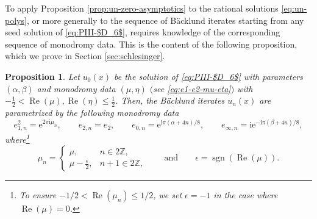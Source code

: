 \documentclass[pdftex]{sigma}
\numberwithin{equation}{section}
\newtheorem{prop}[Theorem]{Proposition}
 { \theoremstyle{definition}
\newtheorem{Definition}[Theorem]{Definition}
\newtheorem{Note}[Theorem]{Note}
\newtheorem{Example}[Theorem]{Example}
\newtheorem{Remark}[Theorem]{Remark} }
\newcommand{\ee}{\mathrm{e}}
\newcommand{\ii}{\mathrm{i}}
\newcommand{\Z}{{\mathbb{Z}}}
\newcommand{\re}{\operatorname{Re}}
\newcommand{\sgn}{\operatorname{sgn}}
\begin{document}
To apply Proposition \ref{prop:un-zero-asymptotics} to the rational solutions \eqref{eq:un-polys}, or more generally to the sequence of B\"acklund iterates starting from any seed solution of \eqref{eq:PIII-$D_6$}, requires knowledge of the corresponding sequence of monodromy data. This is the content of the following proposition, which we prove in Section \ref{sec:schlesinger}.
\begin{prop}\label{prop:schlesinger}
Let $u_0(x)$ be the solution of \eqref{eq:PIII-$D_6$} with parameters $(\alpha,\beta)$ and monodromy data $(\mu,\eta)$ $($see \eqref{eq:e1-e2-mu-eta}$)$ with $-\frac{1}{2}<\re (\mu), \re(\eta)\le\frac{1}{2}$. Then, the B\"acklund iterates $u_n(x)$ are parametrized by the following monodromy data
\[
e^2_{1, n} = \ee^{2\pi \ii \mu_n} ,\qquad e_{2, n} = e_2, \qquad e_{0,n}=\ee^{{\ii\pi(\alpha+4n)}/{8}}, \qquad e_{\infty,n}=\ii\ee^{-{\ii\pi(\beta+4n)}/{8}}, \]
where\footnote{To ensure $-1/2<\re(\mu_n)\leq 1/2$, we set $\epsilon = -1$ in the case where $\re(\mu) = 0$.}
\[
\mu_n = \begin{cases} \mu, & n \in 2\Z, \\ \mu - \frac{\epsilon}{2}, & n + 1 \in 2\Z, \end{cases} \qquad \text{and}\qquad \epsilon = \sgn (\re (\mu)).
\]
\end{prop}
\end{document}
